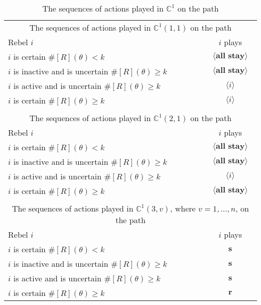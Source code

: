 \documentclass[12pt,letter]{article}
\newcommand{\Kappa}{\mathbb{C}}
\theoremstyle{definition}
\theoremstyle{definition}
\theoremstyle{remark}
\theoremstyle{claim}
\begin{document}
\begin{table}[!htbp]
\caption{The sequences of actions played in $\Kappa^1$ on the path}
\label{Table_cd0}
\begin{center}
\begin{tabular}{l c}
\multicolumn{2}{c}{The sequences of actions played in $\Kappa^1(1,1)$ on the path}\\
Rebel $i$ 	 	&  	$i$ plays		 \\
\hline
\hline
$i$ is certain $\#[R](\theta)<k$ 	& 	$\langle \textbf{all stay} \rangle$	\\
$i$ is inactive and is uncertain $\#[R](\theta)\geq k$	& 	$\langle \textbf{all stay} \rangle$	\\
$i$ is active and is uncertain $\#[R](\theta)\geq k$ &  $\langle i \rangle$  \\
$i$ is certain $\#[R](\theta)\geq k$ &  $\langle i \rangle$  \\
\hline
\\
\multicolumn{2}{c}{The sequences of actions played in $\Kappa^1(2,1)$ on the path}\\
Rebel $i$ 	 	&  	$i$ plays		 \\
\hline
\hline
$i$ is certain $\#[R](\theta)<k$ 	& 	$\langle \textbf{all stay} \rangle$	\\
$i$ is inactive and is uncertain $\#[R](\theta)\geq k$	& 	$\langle \textbf{all stay} \rangle$	\\
$i$ is active and is uncertain $\#[R](\theta)\geq k$ &  $\langle i \rangle$  \\
$i$ is certain $\#[R](\theta)\geq k$ &  $\langle \textbf{all stay} \rangle$  \\
\hline
\\
\multicolumn{2}{c}{The sequences of actions played in $\Kappa^1(3,v)$, where $v=1,...,n$, on the path}\\
Rebel $i$ 	 	&  	$i$ plays		 \\
\hline
\hline
$i$ is certain $\#[R](\theta)<k$ 	& 	$ \textbf{s} $	\\
$i$ is inactive and is uncertain $\#[R](\theta)\geq k$	& 	$ \textbf{s} $	\\
$i$ is active and is uncertain $\#[R](\theta)\geq k$ &  $ \textbf{s} $  \\
$i$ is certain $\#[R](\theta)\geq k$ &  $ \textbf{r} $  \\
\hline
\end{tabular}
\end{center}
\end{table}
\end{document}
